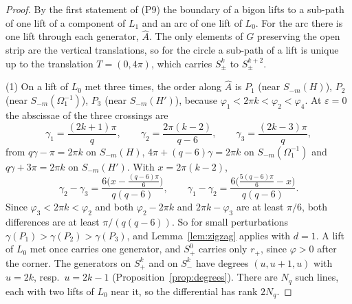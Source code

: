 \begin{proof}
By the first statement of (P9) the boundary of a bigon lifts to a sub-path of one lift of a component of $L_1$ and an arc of
one lift of $L_0$. For the arc there is one lift through each generator, $\hat A$. The only elements of $G$ preserving the open strip
are the vertical translations, so for the circle a sub-path of a lift is unique up to the translation $T=(0,4\pi)$, which
carries $S^k_\pm$ to $S^{k+2}_\pm$.

(1) On a lift of $L_0$ met three times, the order along $\hat A$ is $P_1$ (near $S_{-m}(H)$), $P_2$ (near $S_{-m}(\Omega_1^{-1})$), $P_3$ (near $S_{-m}(H')$),
because $\varphi_1<2\pi k<\varphi_2<\varphi_4$. At $\varepsilon=0$ the abscissae of the three crossings are
\[
\gamma_1=\frac{(2k+1)\pi}q,\qquad \gamma_2=\frac{2\pi(k-2)}{q-6},\qquad \gamma_3=\frac{(2k-3)\pi}q ,
\]
from $q\gamma-\pi=2\pi k$ on $S_{-m}(H)$, $4\pi+(q-6)\gamma=2\pi k$ on $S_{-m}(\Omega_1^{-1})$ and $q\gamma+3\pi=2\pi k$ on $S_{-m}(H')$. With $x=2\pi(k-2)$,
\[
\gamma_2-\gamma_3=\frac{6\bigl(x-\frac{(q-6)\pi}6\bigr)}{q(q-6)},\qquad \gamma_1-\gamma_2=\frac{6\bigl(\frac{5(q-6)\pi}6-x\bigr)}{q(q-6)} .
\]
Since $\varphi_3<2\pi k<\varphi_2$ and both $\varphi_2-2\pi k$ and $2\pi k-\varphi_3$ are at least $\pi/6$, both differences are at least
$\pi/(q(q-6))$. So for small perturbations $\gamma(P_1)>\gamma(P_2)>\gamma(P_3)$, and Lemma~\ref{lem:zigzag} applies with $d=1$. A lift of $L_0$
met once carries one generator, and $S^0_+$ carries only $r_+$, since $\varphi>0$ after the corner. The generators on $S^k_+$ and
on $S^k_-$ have degrees $(u,u+1,u)$ with $u=2k$, resp.\ $u=2k-1$ (Proposition~\ref{prop:degrees}). There are $N_q$ such lines,
each with two lifts of $L_0$ near it, so the differential has rank $2N_q$.


\end{proof}
